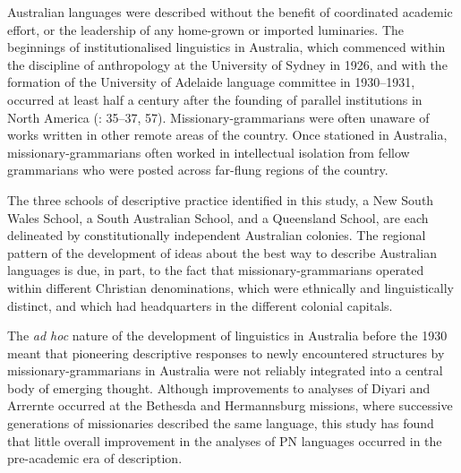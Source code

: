 Australian languages were described without the benefit of coordinated academic effort, or the leadership of any home-grown or imported luminaries. The beginnings of institutionalised linguistics in Australia, which commenced within the discipline of anthropology at the University of Sydney in 1926, and with the formation of the University of Adelaide language committee in 1930--1931, occurred at least half a century after the founding of parallel institutions in North America (\citealt{campbell_american_1997}: 35--37, 57). Missionary-grammarians were often unaware of works written in other remote areas of the country. Once stationed in Australia, missionary-grammarians often worked in intellectual isolation from fellow grammarians who were posted across far-flung regions of the country.

The three schools of descriptive practice identified in this study, a New South Wales School, a South Australian School, and a Queensland School, are each delineated by constitutionally independent Australian colonies. The regional pattern of the development of ideas about the best way to describe Australian languages is due, in part, to the fact that missionary-grammarians operated within different Christian denominations, which were ethnically and linguistically distinct, and which had headquarters in the different colonial capitals.

The \textit{ad hoc} nature of the development of linguistics in Australia before the 1930 meant that pioneering descriptive responses to newly encountered structures by missionary-grammarians in Australia were not reliably integrated into a central body of emerging thought. Although improvements to analyses of Diyari and Arrernte occurred at the Bethesda and Hermannsburg missions, where successive generations of missionaries described the same language, this study has found that little overall improvement in the analyses of PN languages occurred in the pre-academic era of description.

